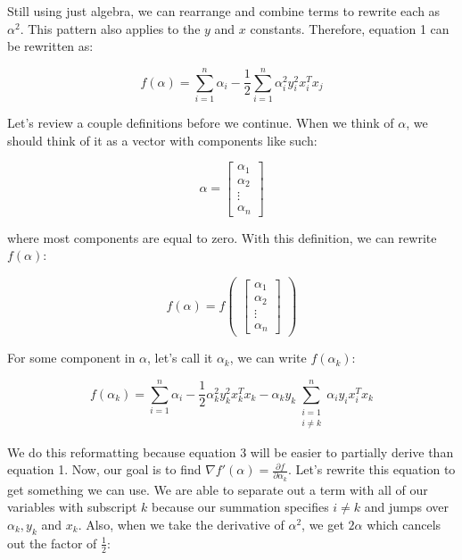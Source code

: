 Still using just algebra, we can rearrange and combine terms to rewrite each as $\alpha^2$. This pattern also applies to the $y$ and $x$ constants. Therefore, equation 1 can be rewritten as:

\begin{equation}
f(\alpha) = \sum\limits_{i=1}^{n} \alpha_i - \frac{1}{2} \sum\limits_{i=1}^{n} \alpha_i^2 y_i^2 x_i^T x_j
\end{equation}

Let's review a couple definitions before we continue. When we think of $\alpha$, we should think of it as a vector with components like such:

\[
\alpha = 
\begin{bmatrix} 
\alpha_1 \\ 
\alpha_2 \\ 
\vdots \\
\alpha_n
\end{bmatrix}
\]

where most components are equal to zero. With this definition, we can rewrite $f(\alpha)$:

\[
    f(\alpha) = f\begin{pmatrix}\begin{bmatrix} 
\alpha_1 \\ 
\alpha_2 \\ 
\vdots \\
\alpha_n
\end{bmatrix}\end{pmatrix}
\]

For some component in $\alpha$, let's call it $\alpha_k$, we can write $f(\alpha_k)$:

\begin{equation}
    f(\alpha_k) = \sum\limits_{i=1}^{n}\alpha_i - \frac{1}{2}\alpha_k^2 y_k^2 x_k^Tx_k - \alpha_k y_k \sum_{\substack{i=1 \\ i \ne k}}^n \alpha_i y_i x_i^Tx_k
\end{equation}

We do this reformatting because equation 3 will be easier to partially derive than equation 1. Now, our goal is to find $\nabla f'(\alpha) = \frac{\partial f}{\partial \alpha_k}$. Let's rewrite this equation to get something we can use. We are able to separate out a term with all of our variables with subscript $k$ because our summation specifies $i \ne k$ and jumps over $\alpha_k, y_k$ and $x_k$. Also, when we take the derivative of $\alpha^2$, we get $2\alpha$ which cancels out the factor of $\frac{1}{2}$:

